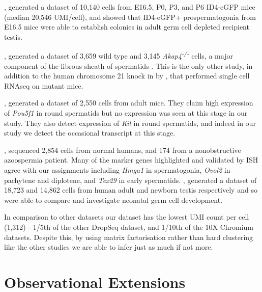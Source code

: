 \cite{Law2019Developmental}, generated a dataset of 10,140 cells from E16.5, P0, P3, and P6 ID4-eGFP mice (median 20,546 UMI/cell), and showed that ID4-eGFP+ prospermatogonia from E16.5 mice were able to establish colonies in adult germ cell depleted recipient testis.

\cite{Fang2019Proteomics}, generated a dataset of 3,659 wild type and 3,145 \textit{Akap4\textsuperscript{-/-}} cells, a major component of the fibrous sheath of spermatids \parencite{Eddy2003Fibrous}. This is the only other study, in addition to the human chromosome 21 knock in by \cite{Ernst2019Staged}, that performed single cell RNAseq on mutant mice.

\cite{Lukassen2018Characterization}, generated a dataset of 2,550 cells from adult mice. They claim high expression of \textit{Pou5f1} in round spermatids but no expression was seen at this stage in our study. They also detect expression of \textit{Kit} in round spermatids, and indeed in our study we detect the occasional transcript at this stage. 


\cite{Wang2018SingleCell}, sequenced 2,854 cells from normal humans, and 174 from a nonobstructive azoospermia patient. Many of the marker genes highlighted and validated by ISH agree with our assignments including \textit{Hmga1} in spermatogonia, \textit{Ovol2} in pachytene and diplotene, and \textit{Tex29} in early spermatids. \cite{Sohni2019Neonatal}, generated a dataset of 18,723 and 14,862 cells from human adult and newborn testis respectively and so were able to compare and investigate neonatal germ cell development.

In comparison to other datasets our dataset has the lowest UMI count per cell (1,312) - 1/5th of the other DropSeq dataset, and 1/10th of the 10X Chromium datasets. Despite this, by using matrix factorisation rather than hard clustering like the other studies we are able to infer just as much if not more.

\section{Observational Extensions}

